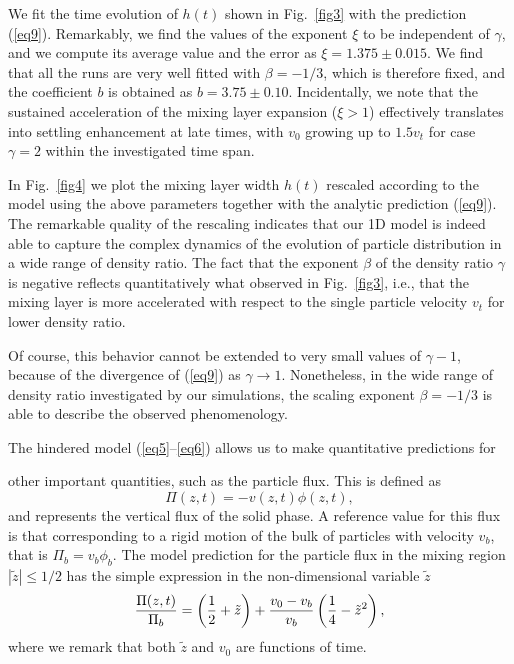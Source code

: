 \documentclass[aps,prl,twocolumn,showpacs,longbibliography]{revtex4-1}
\begin{document}
We fit the time evolution of $h(t)$ shown in Fig.~\ref{fig3}
with the prediction (\ref{eq9}).
Remarkably, we find the values of the exponent $\xi$ to be independent of $\gamma$, and we compute its average value and the error as $\xi=1.375 \pm 0.015$.
We find that all the runs are very well fitted with
$\beta=-1/3$, which is therefore fixed, and the coefficient $b$ is
obtained as $b = 3.75 \pm 0.10$. Incidentally, we note that the sustained acceleration of the mixing layer expansion ($\xi>1$) effectively translates into settling enhancement at late times, with $v_0$ growing up to $1.5v_t$ for case $\gamma=2$ within the investigated time span.


In Fig.~\ref{fig4} we plot the mixing layer width $h(t)$ rescaled according
to the model using the above parameters
together with the analytic prediction (\ref{eq9}).
The remarkable quality of the rescaling indicates that our 1D model is indeed
able to capture the complex dynamics of the evolution of particle distribution in a
wide range of density ratio.
The fact that the exponent $\beta$ of the density ratio $\gamma$ is
negative reflects quantitatively what observed in Fig.~\ref{fig3},
i.e., that the mixing layer is more accelerated with respect to the
single particle velocity $v_t$ for lower density ratio.

Of course, this behavior cannot be extended to
very small values of $\gamma-1$, because of the divergence of
(\ref{eq9}) as $\gamma \to 1$. Nonetheless, in the wide range of
density ratio investigated by our simulations, the scaling exponent
$\beta=-1/3$ is able to describe the observed phenomenology.

The hindered model (\ref{eq5}--\ref{eq6}) allows us to make quantitative predictions for

other important quantities, such as the particle flux. This is defined as
\begin{equation}
\Pi(z,t)=-v(z,t) \phi(z,t),
\label{eq10}
\end{equation}
and represents the vertical flux of the solid phase. A reference value for this flux is that corresponding to a rigid motion of the bulk of particles with velocity $v_b$, that is $\Pi_b=v_b \phi_b$. The model prediction for the particle flux in the mixing region $|\tilde{z}|\le 1/2$ has the simple expression in the non-dimensional variable $\tilde{z}$
\begin{equation}
{\Pi(z,t) \over \Pi_b} = \left({1 \over 2}+\tilde{z} \right)+{v_0-v_b \over v_b} \left({1 \over 4}-\tilde{z}^2 \right),
\label{eq11}
\end{equation}
where we remark that both $\tilde{z}$ and $v_0$ are functions of time.
\end{document}
